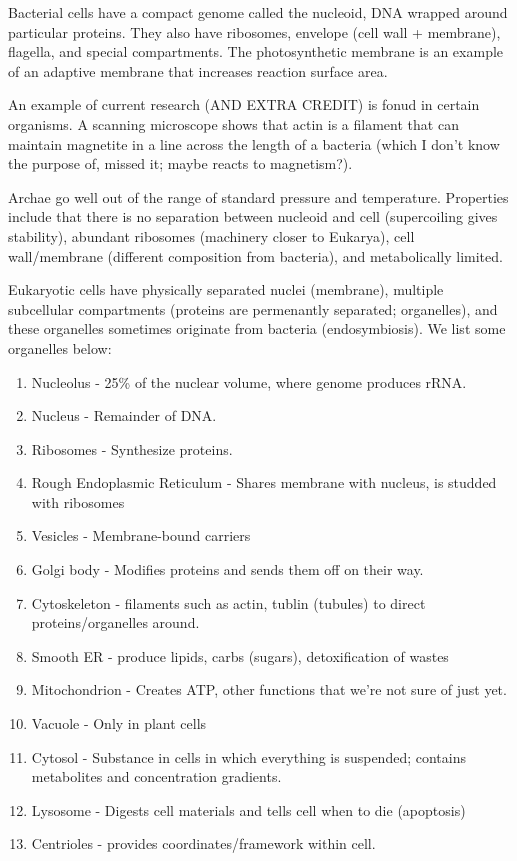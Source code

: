 \documentclass[12pt]{article}
\begin{document}
Bacterial cells have a compact genome called the nucleoid, DNA wrapped around particular proteins. They also have ribosomes, envelope (cell wall + membrane), flagella, and special compartments. The photosynthetic membrane is an example of an adaptive membrane that increases reaction surface area.

An example of current research (AND EXTRA CREDIT) is fonud in certain organisms. A scanning microscope shows that actin is a filament that can maintain magnetite in a line across the length of a bacteria (which I don't know the purpose of, missed it; maybe reacts to magnetism?).

Archae go well out of the range of standard pressure and temperature. Properties include that there is no separation between nucleoid and cell (supercoiling gives stability), abundant ribosomes (machinery closer to Eukarya), cell wall/membrane (different composition from bacteria), and metabolically limited.

Eukaryotic cells have physically separated nuclei (membrane), multiple subcellular compartments (proteins are permenantly separated; organelles), and these organelles sometimes originate from bacteria (endosymbiosis). We list some organelles below:

\begin{enumerate}
	\item Nucleolus - 25\% of the nuclear volume, where genome produces rRNA.
	\item Nucleus - Remainder of DNA.
	\item Ribosomes - Synthesize proteins.
	\item Rough Endoplasmic Reticulum - Shares membrane with nucleus, is studded with ribosomes
	\item Vesicles - Membrane-bound carriers
	\item Golgi body - Modifies proteins and sends them off on their way.
	\item Cytoskeleton - filaments such as actin, tublin (tubules) to direct proteins/organelles around.
	\item Smooth ER - produce lipids, carbs (sugars), detoxification of wastes
	\item Mitochondrion - Creates ATP, other functions that we're not sure of just yet.
	\item Vacuole - Only in plant cells
	\item Cytosol - Substance in cells in which everything is suspended; contains metabolites and concentration gradients.
	\item Lysosome - Digests cell materials and tells cell when to die (apoptosis)
	\item Centrioles - provides coordinates/framework within cell.
\end{enumerate}
\end{document}
